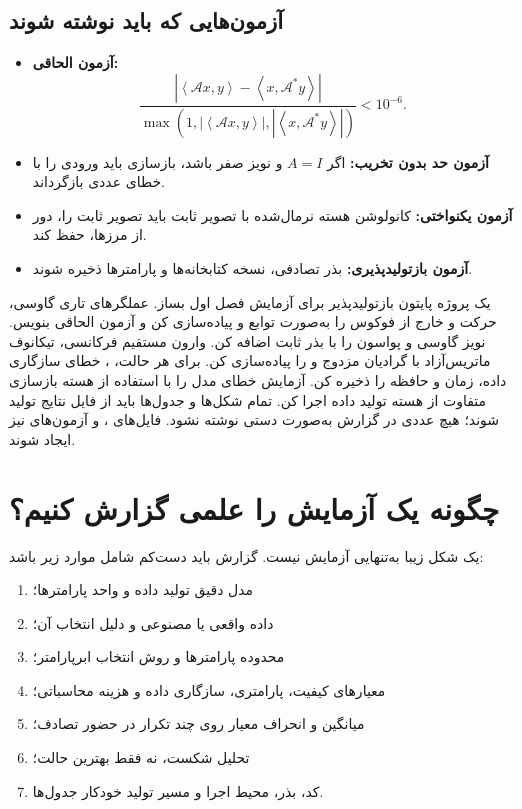 \documentclass[12pt,openany,oneside]{book}
\newcommand{\abs}[1]{\left\lvert #1\right\rvert}
\newcommand{\inner}[2]{\left\langle #1,#2\right\rangle}
\newcommand{\op}[1]{\mathcal{#1}}
\begin{document}
\subsection{آزمون‌هایی که باید نوشته شوند}
\begin{itemize}
\item \textbf{آزمون الحاقی:}
\begin{equation}
\frac{\abs{\inner{\op A x}{y}-\inner{x}{\op A^*y}}}
{\max(1,\abs{\inner{\op A x}{y}},\abs{\inner{x}{\op A^*y}})}<10^{-6}.
\end{equation}
\item \textbf{آزمون حد بدون تخریب:} اگر \(A=I\) و نویز صفر باشد، بازسازی باید ورودی را با خطای عددی بازگرداند.
\item \textbf{آزمون یکنواختی:} کانولوشن هسته نرمال‌شده با تصویر ثابت باید تصویر ثابت را، دور از مرزها، حفظ کند.
\item \textbf{آزمون بازتولیدپذیری:} بذر تصادفی، نسخه کتابخانه‌ها و پارامترها ذخیره شوند.
\end{itemize}

\begin{keybox}
یک پروژه پایتون بازتولیدپذیر برای آزمایش فصل اول بساز. عملگرهای تاری گاوسی، حرکت و خارج از فوکوس را
به‌صورت توابع  و  پیاده‌سازی کن و آزمون الحاقی بنویس. نویز گاوسی و پواسون را
با بذر ثابت اضافه کن. وارون مستقیم فرکانسی، تیکانوف ماتریس‌آزاد با گرادیان مزدوج و  را پیاده‌سازی کن.
برای هر حالت، ، خطای سازگاری داده، زمان و حافظه را ذخیره کن. آزمایش خطای مدل را با
استفاده از هسته بازسازی متفاوت از هسته تولید داده اجرا کن. تمام شکل‌ها و جدول‌ها باید از فایل نتایج تولید شوند؛
هیچ عددی در گزارش به‌صورت دستی نوشته نشود. فایل‌های ،  و آزمون‌های
 نیز ایجاد شوند.
\end{keybox}

\section{چگونه یک آزمایش را علمی گزارش کنیم؟}

یک شکل زیبا به‌تنهایی آزمایش نیست. گزارش باید دست‌کم شامل موارد زیر باشد:
\begin{enumerate}
\item مدل دقیق تولید داده و واحد پارامترها؛
\item داده واقعی یا مصنوعی و دلیل انتخاب آن؛
\item محدوده پارامترها و روش انتخاب ابرپارامتر؛
\item معیارهای کیفیت، پارامتری، سازگاری داده و هزینه محاسباتی؛
\item میانگین و انحراف معیار روی چند تکرار در حضور تصادف؛
\item تحلیل شکست، نه فقط بهترین حالت؛
\item کد، بذر، محیط اجرا و مسیر تولید خودکار جدول‌ها.
\end{enumerate}
\end{document}
